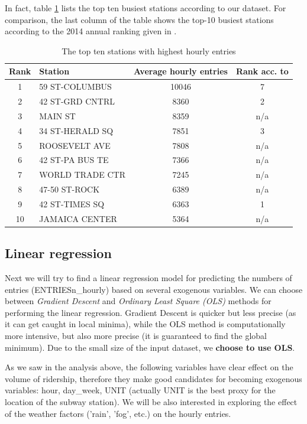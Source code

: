 \documentclass{article}
\begin{document}
In fact, table \ref{tab:top-ten-hourly} lists the top ten busiest stations according to our dataset. For comparison, the last column of the table shows the top-10 busiest stations according to the 2014 annual ranking given in \cite{mta_subway_data}.

\begin{table}[h!]
\centering
\begin{tabular}{c|l|c|c}
\hline
Rank & Station & Average hourly entries & Rank acc. to \cite{mta_subway_data} \\
\hline
1 & 59 ST-COLUMBUS  & 10046 & 7\\
2 & 42 ST-GRD CNTRL & 8360 & 2 \\
3 & MAIN ST         & 8359 & n/a \\
4 & 34 ST-HERALD SQ & 7851 & 3 \\
5 & ROOSEVELT AVE   & 7808 & n/a \\
6 & 42 ST-PA BUS TE & 7366 & n/a \\
7 & WORLD TRADE CTR & 7245 & n/a \\
8 & 47-50 ST-ROCK   & 6389 & n/a \\
9 & 42 ST-TIMES SQ  & 6363  & 1 \\
10 & JAMAICA CENTER  & 5364 & n/a \\
\hline
\end{tabular}
\caption{The top ten stations with highest hourly entries}
\label{tab:top-ten-hourly}
\end{table}

\subsection{Linear regression}

Next we will try to find a linear regression model for predicting the numbers of entries (ENTRIESn\_hourly) based on several exogenous variables. We can choose between \textit{Gradient Descent} and \textit{Ordinary Least Square (OLS)} methods for performing the linear regression. Gradient Descent is quicker but less precise (as it can get caught in local minima), while the OLS method is computationally more intensive, but also more precise (it is guaranteed to find the global minimum). Due to the small size of the input dataset, we \textbf{choose to use OLS}.

As we saw in the analysis above, the following variables have clear effect on the volume of ridership, therefore they make good candidates for becoming exogenous variables: hour, day\_week, UNIT (actually UNIT is the best proxy for the location of the subway station). We will be also interested in exploring the effect of the weather factors ('rain', 'fog', etc.) on the hourly entries.
\end{document}
